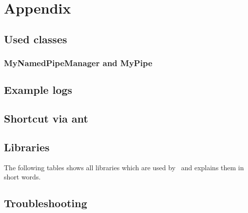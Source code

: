 \chapter{Appendix}
    \section{Used classes}
      \subsection{MyNamedPipeManager and MyPipe}
	\setJavaCodeListing
	\lstset{caption=MyNamedPipeManager.java}
	

	\setJavaCodeListing
	\lstset{caption=MyPipe.java}
	

    \section{Example logs}
    \section{Shortcut via ant}
    \section{Libraries}
      The following tables shows all libraries which are used by \Kieker\ and explains them in short words.
      
    \section{Troubleshooting}